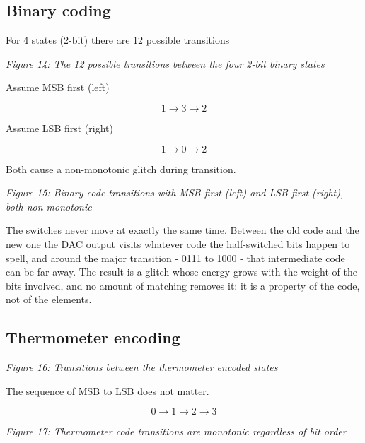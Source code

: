 \subsection{Binary coding}\label{binary-coding}

For 4 states (2-bit) there are 12 possible transitions


{
\centering
{}
}

\emph{Figure 14: The 12 possible transitions between the four 2-bit
binary states}

Assume MSB first (left)

\[ 1 \rightarrow 3 \rightarrow 2 \]

Assume LSB first (right)

\[ 1 \rightarrow 0 \rightarrow 2 \]

Both cause a non-monotonic glitch during transition.


{
\centering
{}
}

\emph{Figure 15: Binary code transitions with MSB first (left) and LSB
first (right), both non-monotonic}

The switches never move at exactly the same time. Between the old code
and the new one the DAC output visits whatever code the half-switched
bits happen to spell, and around the major transition - 0111 to 1000 -
that intermediate code can be far away. The result is a glitch whose
energy grows with the weight of the bits involved, and no amount of
matching removes it: it is a property of the code, not of the elements.

\subsection{Thermometer encoding}\label{thermometer-encoding}


{
\centering
{}
}

\emph{Figure 16: Transitions between the thermometer encoded states}

The sequence of MSB to LSB does not matter.

\[ 0 \rightarrow 1 \rightarrow 2  \rightarrow 3\]


{
\centering
{}
}

\emph{Figure 17: Thermometer code transitions are monotonic regardless
of bit order}

